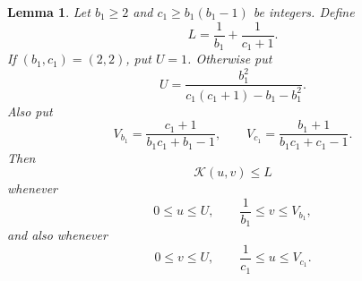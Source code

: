 \documentclass[10pt,a4paper]{amsart}
\newtheorem{lemma}{Lemma}
\newcommand{\Kfun}{\mathcal K}
\begin{document}
\begin{lemma}\label{lem:arithmetic-bound}
Let $b_1\ge2$ and $c_1\geq b_1(b_1-1)$ be integers.  Define
$$
        L=\frac{1}{b_1}+\frac1{c_1+1}.
$$
If $(b_1,c_1)=(2,2)$, put $U=1$.  Otherwise put
$$
        U=\frac{b_1^2}{c_1(c_1+1)-b_1-b_1^2}.
$$
Also put
$$
        V_{b_1}=\frac{c_1+1}{b_1c_1+b_1-1},
        \qquad
        V_{c_1}=\frac{b_1+1}{b_1c_1+c_1-1}.
$$
Then
\begin{equation}\label{eq:arithmetic-main}
        \Kfun(u,v)\le L
\end{equation}
whenever
\begin{equation}\label{eq:arithmetic-first-range}
        0\le u\le U,
        \qquad
        \frac{1}{b_1}\le v\le V_{b_1},
\end{equation}
and also whenever
\begin{equation}\label{eq:arithmetic-second-range}
        0\le v\le U,
        \qquad
        \frac{1}{c_1}\le u\le V_{c_1}.
\end{equation}
\end{lemma}
\end{document}
